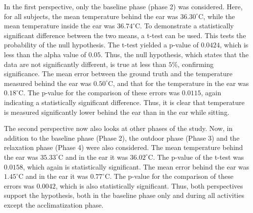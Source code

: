 In the first perspective, only the baseline phase (phase 2) was considered. 
Here, for all subjects, the mean temperature behind the ear was \(36.30^\circ\text{C}\), while the mean temperature inside the ear was \(36.74^\circ\text{C}\). 
To demonstrate a statistically significant difference between the two means, a t-test can be used.
This tests the probability of the null hypothesis.
The t-test yielded a p-value of \(0.0424\), which is less than the alpha value of \(0.05\). 
Thus, the null hypothesis, which states that the data are not significantly different, is true at less than $5\%$, confirming significance.
The mean error between the ground truth and the temperature measured behind the ear was \(0.50^\circ\text{C}\), and that for the temperature in the ear was \(0.18^\circ\text{C}\). 
The p-value for the comparison of these errors was \(0.0115\), again indicating a statistically significant difference.
Thus, it is clear that temperature is measured significantly lower behind the ear than in the ear while sitting.

The second perspective now also looks at other phases of the study. 
Now, in addition to the baseline phase (Phase 2), the outdoor phase (Phase 3) and the relaxation phase (Phase 4) were also considered. 
The mean temperature behind the ear was \(35.33^\circ\text{C}\) and in the ear it was \(36.02^\circ\text{C}\). 
The p-value of the t-test was \(0.0158\), which again is statistically significant.
The mean error behind the ear was \(1.45^\circ\text{C}\) and in the ear it was \(0.77^\circ\text{C}\). 
The p-value for the comparison of these errors was \(0.0042\), which is also statistically significant.
Thus, both perspectives support the hypothesis, both in the baseline phase only and during all activities except the acclimatization phase.

